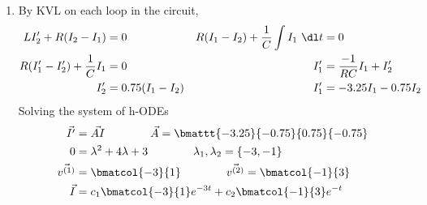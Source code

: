 \begin{enumerate}
    \item By KVL on each loop in the circuit,
          \begin{align}
              LI_2' + R(I_2 - I_1)                      & = 0                       &
              R(I_1 - I_2) + \frac{1}{C}\int I_1\ \dl t & = 0                         \\
              R(I_1' - I_2') + \frac{1}{C}I_1           & = 0                       &
              I_1'                                      & = \frac{-1}{RC}I_1 + I_2'   \\
              I_2'                                      & = 0.75(I_1 - I_2)         &
              I_1'                                      & = -3.25I_1 - 0.75I_2
          \end{align}
          Solving the system of h-ODEs
          \begin{align}
              \vec{I'}      & = \vec{AI}
              \qquad\qquad
              \vec{A}                           = \bmattt{-3.25}{-0.75}{0.75}{-0.75} \\
              0             & = \lambda^{2} + 4\lambda + 3
              \qquad\qquad
              \lambda_1, \lambda_2              = \left\{ -3, -1 \right\}            \\
              \vec{v^{(1)}} & = \bmatcol{-3}{1}
              \qquad\qquad
              \vec{v^{(2)}} = \bmatcol{-1}{3}                                        \\
              \vec{I}       & = c_1 \bmatcol{-3}{1}e^{-3t}
              + c_2 \bmatcol{-1}{3}e^{-t}
          \end{align}


\end{enumerate}
